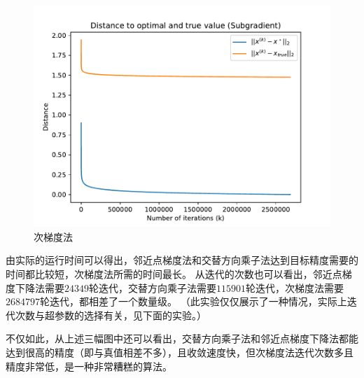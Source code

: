 \documentclass[logo,reportComp]{thesis}
\begin{document}
\begin{figure}[H]
\centering
\includegraphics[width=0.5\linewidth]{fig/subgrad.pdf}
\caption{次梯度法}
\label{fig:subgrad}
\end{figure}

由实际的运行时间可以得出，邻近点梯度法和交替方向乘子法达到目标精度需要的时间都比较短，次梯度法所需的时间最长。
从迭代的次数也可以看出，邻近点梯度下降法需要$24349$轮迭代，交替方向乘子法需要$115901$轮迭代，次梯度法需要$2684797$轮迭代，都相差了一个数量级。
（此实验仅仅展示了一种情况，实际上迭代次数与超参数的选择有关，见下面的实验。）

不仅如此，从上述三幅图中还可以看出，交替方向乘子法和邻近点梯度下降法都能达到很高的精度（即与真值相差不多），且收敛速度快，但次梯度法迭代次数多且精度非常低，是一种非常糟糕的算法。
\end{document}
